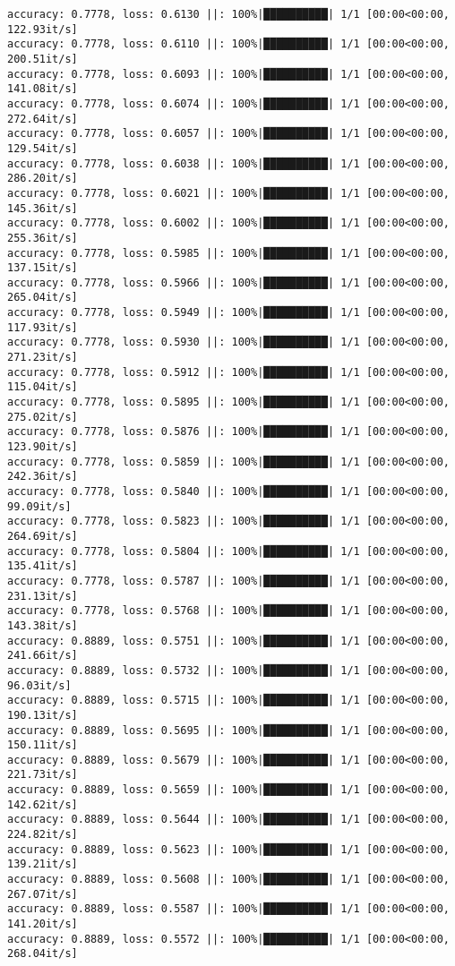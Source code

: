 \documentclass[
]{article}
\begin{document}
\begin{verbatim}
accuracy: 0.7778, loss: 0.6130 ||: 100%|██████████| 1/1 [00:00<00:00, 122.93it/s]
accuracy: 0.7778, loss: 0.6110 ||: 100%|██████████| 1/1 [00:00<00:00, 200.51it/s]
accuracy: 0.7778, loss: 0.6093 ||: 100%|██████████| 1/1 [00:00<00:00, 141.08it/s]
accuracy: 0.7778, loss: 0.6074 ||: 100%|██████████| 1/1 [00:00<00:00, 272.64it/s]
accuracy: 0.7778, loss: 0.6057 ||: 100%|██████████| 1/1 [00:00<00:00, 129.54it/s]
accuracy: 0.7778, loss: 0.6038 ||: 100%|██████████| 1/1 [00:00<00:00, 286.20it/s]
accuracy: 0.7778, loss: 0.6021 ||: 100%|██████████| 1/1 [00:00<00:00, 145.36it/s]
accuracy: 0.7778, loss: 0.6002 ||: 100%|██████████| 1/1 [00:00<00:00, 255.36it/s]
accuracy: 0.7778, loss: 0.5985 ||: 100%|██████████| 1/1 [00:00<00:00, 137.15it/s]
accuracy: 0.7778, loss: 0.5966 ||: 100%|██████████| 1/1 [00:00<00:00, 265.04it/s]
accuracy: 0.7778, loss: 0.5949 ||: 100%|██████████| 1/1 [00:00<00:00, 117.93it/s]
accuracy: 0.7778, loss: 0.5930 ||: 100%|██████████| 1/1 [00:00<00:00, 271.23it/s]
accuracy: 0.7778, loss: 0.5912 ||: 100%|██████████| 1/1 [00:00<00:00, 115.04it/s]
accuracy: 0.7778, loss: 0.5895 ||: 100%|██████████| 1/1 [00:00<00:00, 275.02it/s]
accuracy: 0.7778, loss: 0.5876 ||: 100%|██████████| 1/1 [00:00<00:00, 123.90it/s]
accuracy: 0.7778, loss: 0.5859 ||: 100%|██████████| 1/1 [00:00<00:00, 242.36it/s]
accuracy: 0.7778, loss: 0.5840 ||: 100%|██████████| 1/1 [00:00<00:00, 99.09it/s]
accuracy: 0.7778, loss: 0.5823 ||: 100%|██████████| 1/1 [00:00<00:00, 264.69it/s]
accuracy: 0.7778, loss: 0.5804 ||: 100%|██████████| 1/1 [00:00<00:00, 135.41it/s]
accuracy: 0.7778, loss: 0.5787 ||: 100%|██████████| 1/1 [00:00<00:00, 231.13it/s]
accuracy: 0.7778, loss: 0.5768 ||: 100%|██████████| 1/1 [00:00<00:00, 143.38it/s]
accuracy: 0.8889, loss: 0.5751 ||: 100%|██████████| 1/1 [00:00<00:00, 241.66it/s]
accuracy: 0.8889, loss: 0.5732 ||: 100%|██████████| 1/1 [00:00<00:00, 96.03it/s]
accuracy: 0.8889, loss: 0.5715 ||: 100%|██████████| 1/1 [00:00<00:00, 190.13it/s]
accuracy: 0.8889, loss: 0.5695 ||: 100%|██████████| 1/1 [00:00<00:00, 150.11it/s]
accuracy: 0.8889, loss: 0.5679 ||: 100%|██████████| 1/1 [00:00<00:00, 221.73it/s]
accuracy: 0.8889, loss: 0.5659 ||: 100%|██████████| 1/1 [00:00<00:00, 142.62it/s]
accuracy: 0.8889, loss: 0.5644 ||: 100%|██████████| 1/1 [00:00<00:00, 224.82it/s]
accuracy: 0.8889, loss: 0.5623 ||: 100%|██████████| 1/1 [00:00<00:00, 139.21it/s]
accuracy: 0.8889, loss: 0.5608 ||: 100%|██████████| 1/1 [00:00<00:00, 267.07it/s]
accuracy: 0.8889, loss: 0.5587 ||: 100%|██████████| 1/1 [00:00<00:00, 141.20it/s]
accuracy: 0.8889, loss: 0.5572 ||: 100%|██████████| 1/1 [00:00<00:00, 268.04it/s]

\end{verbatim}
\end{document}
